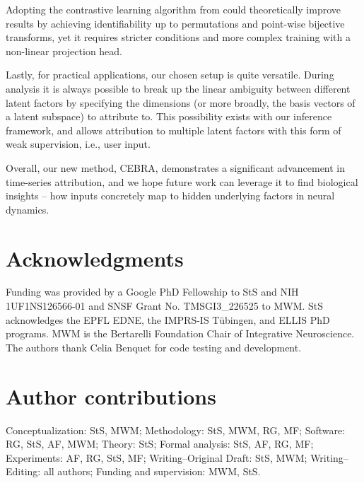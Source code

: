     Adopting the contrastive learning algorithm from \citet{hyvarinen2019nonlinear} could theoretically improve results by achieving identifiability up to permutations and point-wise bijective transforms, yet it requires stricter conditions and more complex training with a non-linear projection head. 
      
    Lastly, for practical applications, our chosen setup is quite versatile. During analysis it is always possible to break up the linear ambiguity between different latent factors by specifying the dimensions (or more broadly, the basis vectors of a latent subspace) to attribute to. This possibility exists with our inference framework, and allows attribution to multiple latent factors with this form of weak supervision, i.e., user input.

    Overall, our new method, CEBRA, demonstrates a significant advancement in time-series attribution, and we hope future work can leverage it to find biological insights -- how inputs concretely map to hidden underlying factors in neural dynamics.

    
\newpage
\balance
\section*{Acknowledgments}
    Funding was provided by a Google PhD Fellowship to StS and NIH 1UF1NS126566-01 and SNSF Grant No. TMSGI3\_226525 to MWM. StS acknowledges the EPFL EDNE, the IMPRS-IS T\"ubingen, and ELLIS PhD programs. MWM is the Bertarelli Foundation Chair of Integrative Neuroscience. The authors thank Celia Benquet for code testing and development.

\section*{Author contributions}

        Conceptualization: StS, MWM;
        Methodology: StS, MWM, RG, MF;
        Software: RG, StS, AF, MWM;
        Theory: StS;
        Formal analysis: StS, AF, RG, MF;
        Experiments: AF, RG, StS, MF;
        Writing--Original Draft: StS, MWM;
        Writing--Editing: all authors;
        Funding and supervision: MWM, StS.

